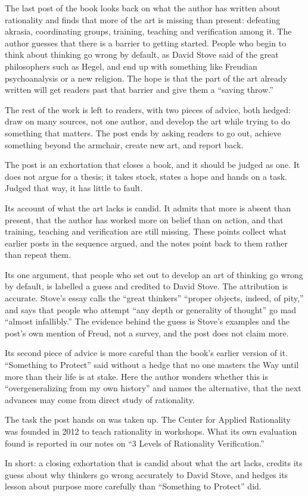 \begin{afterword}
\summaryhead

The last post of the book looks back on what the author has written about rationality and finds that more of the art is missing than present: defeating akrasia, coordinating groups, training, teaching and verification among it. The author guesses that there is a barrier to getting started. People who begin to think about thinking go wrong by default, as David Stove said of the great philosophers such as Hegel, and end up with something like Freudian psychoanalysis or a new religion. The hope is that the part of the art already written will get readers past that barrier and give them a ``saving throw.''

The rest of the work is left to readers, with two pieces of advice, both hedged: draw on many sources, not one author, and develop the art while trying to do something that matters. The post ends by asking readers to go out, achieve something beyond the armchair, create new art, and report back.

\responsehead

The post is an exhortation that closes a book, and it should be judged as one. It does not argue for a thesis; it takes stock, states a hope and hands on a task. Judged that way, it has little to fault.

Its account of what the art lacks is candid. It admits that more is absent than present, that the author has worked more on belief than on action, and that training, teaching and verification are still missing. These points collect what earlier posts in the sequence argued, and the notes point back to them rather than repeat them.

Its one argument, that people who set out to develop an art of thinking go wrong by default, is labelled a guess and credited to David Stove. The attribution is accurate. Stove's essay calls the ``great thinkers'' ``proper objects, indeed, of pity,'' and says that people who attempt ``any depth or generality of thought'' go mad ``almost infallibly.'' The evidence behind the guess is Stove's examples and the post's own mention of Freud, not a survey, and the post does not claim more.

Its second piece of advice is more careful than the book's earlier version of it. ``Something to Protect'' said without a hedge that no one masters the Way until more than their life is at stake. Here the author wonders whether this is ``overgeneralizing from my own history'' and names the alternative, that the next advances may come from direct study of rationality.

The task the post hands on was taken up. The Center for Applied Rationality was founded in 2012 to teach rationality in workshops. What its own evaluation found is reported in our notes on ``3 Levels of Rationality Verification.''

In short: a closing exhortation that is candid about what the art lacks, credits its guess about why thinkers go wrong accurately to David Stove, and hedges its lesson about purpose more carefully than ``Something to Protect'' did.
\end{afterword}
